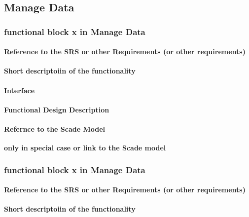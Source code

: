 \subsection{Manage Data}

\subsubsection{functional block x in Manage Data}%
\paragraph{Reference to the SRS or other Requirements (or other requirements)}
\paragraph{Short descriptoiin of the functionality}
\paragraph{Interface}
\paragraph{Functional Design Description}
\paragraph{Refernce to the Scade Model}
\textbf{only in special case or link to the Scade model}

\subsubsection{functional block x in Manage Data}%
\paragraph{Reference to the SRS or other Requirements (or other requirements)}
\paragraph{Short descriptoiin of the functionality}
